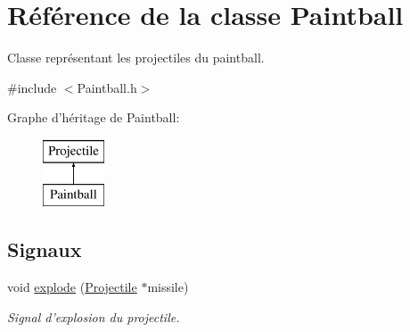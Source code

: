 \hypertarget{classPaintball}{
\section{Référence de la classe Paintball}
\label{classPaintball}
}


Classe représentant les projectiles du paintball.  




{\ttfamily \#include $<$Paintball.h$>$}

Graphe d'héritage de Paintball:\begin{figure}[H]
\begin{center}
\leavevmode
\includegraphics[height=2.000000cm]{classPaintball}
\end{center}
\end{figure}
\subsection*{Signaux}
\begin{DoxyCompactItemize}
\item 
void \hyperlink{classProjectile_a18d1fccd74f92b54f239c13c74cbc00c}{explode} (\hyperlink{classProjectile}{Projectile} $\ast$missile)
\begin{DoxyCompactList}\small\item\em Signal d'explosion du projectile. \end{DoxyCompactList}\end{DoxyCompactItemize}
